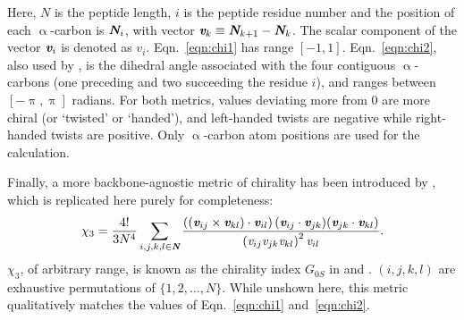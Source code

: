 \documentclass[fleqn,10pt,lineno]{wlpeerj} %
\newcommand{\n}[1]{{\color{blue}#1}}
\newcommand{\Eqn}[1]{Eqn.~\ref{#1}}
\newcommand{\ang}{$\textrm\AA$\xspace}
\newcommand{\cis}{{\em cis}\xspace}
\newcommand{\trans}{{\em trans}\xspace}
\begin{document}
Here, $N$ is the peptide length, $i$ is the peptide residue number and the position of each $\upalpha$-carbon is $\textit{\textbf{N}}_i$, with vector $\textit{\textbf{v}}_{k} \equiv \textit{\textbf{N}}_{k+1} - \textit{\textbf{N}}_{k}$. 
The scalar component of the vector $\textit{\textbf{v}}_i$ is denoted as $\textit{v}_i$. 
\n{\Eqn{eqn:chi1} has range $[-1,1]$. \Eqn{eqn:chi2}, also used by \cite{Gruziel2013}, is the dihedral angle associated with the four contiguous $\upalpha$-carbons (one preceding and two succeeding the residue $i$), and ranges between $[-\uppi,\uppi]$ radians. For both metrics, values}  deviating more from 0 are more chiral (or `twisted' or `handed'), and left-handed twists are negative while right-handed twists are positive. Only $
\upalpha$-carbon atom positions are used for the calculation. 

\n{Finally, a more backbone-agnostic metric of chirality has been introduced by \cite{Solymosi2002}, which is replicated here purely for completeness:
\begin{equation}\label{eqn:chi3}
\displaystyle \chi_3 = \frac{4!}{3N^4} \sum_{i,j,k,l \in \textit{\textbf{N}}} \frac{\left((\textit{\textbf{v}}_{ij} \times \textit{\textbf{v}}_{kl}) \cdot \textit{\textbf{v}}_{il}\right) (\textit{\textbf{v}}_{ij} \cdot \textit{\textbf{v}}_{jk}) (\textit{\textbf{v}}_{jk} \cdot \textit{\textbf{v}}_{kl})} {\left(\textit{v}_{ij} \textit{v}_{jk} \textit{v}_{kl}\right)^2 \textit{v}_{il}}.
\end{equation}
$\chi_3$, of arbitrary range, is known as the chirality index $G_{0S}$ in \cite{Solymosi2002} and \cite{Neal2003}. $(i,j,k,l)$ are exhaustive permutations of $\{1,2,\ldots,N\}$. While unshown here, this metric qualitatively matches the values of \Eqn{eqn:chi1} and~\ref{eqn:chi2}.}
\end{document}
